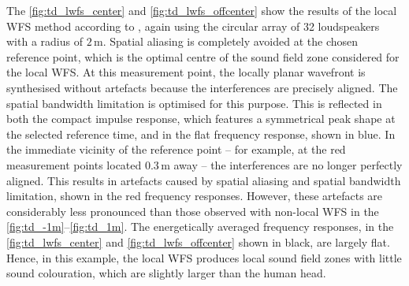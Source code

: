 The \myfigs\ref{fig:td_lwfs_center} and \ref{fig:td_lwfs_offcenter} show the
results of the local WFS method according to \cite{Hahn2022_JAES},
again using the circular array of 32 loudspeakers with a radius of $2$\,m.
%
Spatial aliasing is completely avoided at the chosen reference point,
which is the optimal centre of the sound field zone considered for
the local WFS.
%
At this measurement point, the locally planar wavefront is synthesised
without artefacts because the interferences are precisely aligned.
The spatial bandwidth limitation is optimised for this purpose.
%
This is reflected in both the compact impulse response, which features
a symmetrical peak shape at the selected reference time, and in the
flat frequency response, shown in blue.
%
In the immediate vicinity of the reference point -- for example, at the red
measurement points located $0{.}3$\,m away -- the interferences are no longer
perfectly aligned.
%
This results in artefacts caused by spatial aliasing and spatial bandwidth
limitation, shown in the red frequency responses.
However, these artefacts are considerably less pronounced than those
observed with non-local WFS in the \myfigs\ref{fig:td_-1m}--\ref{fig:td_1m}.
%
The energetically averaged frequency responses, in the
\myfigs\ref{fig:td_lwfs_center} and \ref{fig:td_lwfs_offcenter} shown in black,
are largely flat.
%
Hence, in this example, the local WFS produces local sound field zones
with little sound colouration, which are slightly larger than
the human head.



